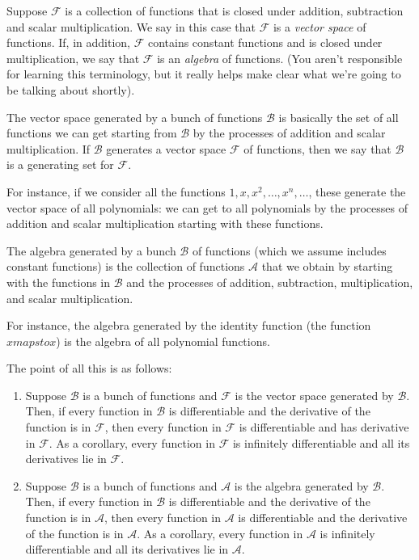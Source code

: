 \documentclass[10pt]{amsart}
\begin{document}
Suppose $\mathcal{F}$ is a collection of functions that is closed
under addition, subtraction and scalar multiplication. We say in this
case that $\mathcal{F}$ is a {\em vector space} of functions. If, in
addition, $\mathcal{F}$ contains constant functions and is closed
under multiplication, we say that $\mathcal{F}$ is an {\em algebra} of
functions. (You aren't responsible for learning this terminology, but
it really helps make clear what we're going to be talking about
shortly).

The vector space generated by a bunch of functions $\mathcal{B}$ is
basically the set of all functions we can get starting from
$\mathcal{B}$ by the processes of addition and scalar
multiplication. If $\mathcal{B}$ generates a vector space
$\mathcal{F}$ of functions, then we say that $\mathcal{B}$ is a
generating set for $\mathcal{F}$.

For instance, if we consider all the functions $1, x, x^2, \dots, x^n,
\dots$, these generate the vector space of all polynomials: we can get
to all polynomials by the processes of addition and scalar
multiplication starting with these functions.

The algebra generated by a bunch $\mathcal{B}$ of functions (which we
assume includes constant functions) is the collection of functions
$\mathcal{A}$ that we obtain by starting with the functions in
$\mathcal{B}$ and the processes of addition, subtraction,
multiplication, and scalar multiplication.

For instance, the algebra generated by the identity function (the
function $x mapsto x$) is the algebra of all polynomial functions.

The point of all this is as follows:

\begin{enumerate}
\item Suppose $\mathcal{B}$ is a bunch of functions and $\mathcal{F}$
  is the vector space generated by $\mathcal{B}$. Then, if every
  function in $\mathcal{B}$ is differentiable and the derivative of
  the function is in $\mathcal{F}$, then every function in
  $\mathcal{F}$ is differentiable and has derivative in
  $\mathcal{F}$. As a corollary, every function in $\mathcal{F}$ is
  infinitely differentiable and all its derivatives lie in
  $\mathcal{F}$.
\item Suppose $\mathcal{B}$ is a bunch of functions and $\mathcal{A}$
  is the algebra generated by $\mathcal{B}$. Then, if every function
  in $\mathcal{B}$ is differentiable and the derivative of the
  function is in $\mathcal{A}$, then every function in $\mathcal{A}$
  is differentiable and the derivative of the function is in
  $\mathcal{A}$. As a corollary, every function in $\mathcal{A}$ is
  infinitely differentiable and all its derivatives lie in
  $\mathcal{A}$.
\end{enumerate}
\end{document}
